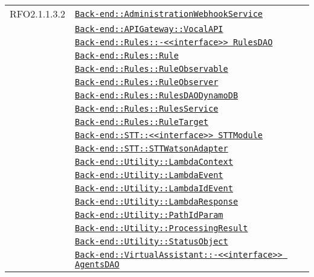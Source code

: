 \begin{longtable}{|>{\centering}m{3cm}|m{10cm}<{\centering}|}
RFO2.1.1.3.2 & \hyperref[Back-end::AdministrationWebhookService]{\texttt{Back-end::AdministrationWebhookService}}\\
& \hyperref[Back-end::APIGateway::VocalAPI]{\texttt{Back-end::APIGateway::VocalAPI}}\\
& \hyperref[Back-end::Rules::<<interface>> RulesDAO]{\texttt{Back-end::Rules::-\linebreak <<interface>> RulesDAO}}\\
& \hyperref[Back-end::Rules::Rule]{\texttt{Back-end::Rules::Rule}}\\
& \hyperref[Back-end::Rules::RuleObservable]{\texttt{Back-end::Rules::RuleObservable}}\\
& \hyperref[Back-end::Rules::RuleObserver]{\texttt{Back-end::Rules::RuleObserver}}\\
& \hyperref[Back-end::Rules::RulesDAODynamoDB]{\texttt{Back-end::Rules::RulesDAODynamoDB}}\\
& \hyperref[Back-end::Rules::RulesService]{\texttt{Back-end::Rules::RulesService}}\\
& \hyperref[Back-end::Rules::RuleTarget]{\texttt{Back-end::Rules::RuleTarget}}\\
& \hyperref[Back-end::STT::<<interface>> STTModule]{\texttt{Back-end::STT::<<interface>> STTModule}}\\
& \hyperref[Back-end::STT::STTWatsonAdapter]{\texttt{Back-end::STT::STTWatsonAdapter}}\\
& \hyperref[Back-end::Utility::LambdaContext]{\texttt{Back-end::Utility::LambdaContext}}\\
& \hyperref[Back-end::Utility::LambdaEvent]{\texttt{Back-end::Utility::LambdaEvent}}\\
& \hyperref[Back-end::Utility::LambdaIdEvent]{\texttt{Back-end::Utility::LambdaIdEvent}}\\
& \hyperref[Back-end::Utility::LambdaResponse]{\texttt{Back-end::Utility::LambdaResponse}}\\
& \hyperref[Back-end::Utility::PathIdParam]{\texttt{Back-end::Utility::PathIdParam}}\\
& \hyperref[Back-end::Utility::ProcessingResult]{\texttt{Back-end::Utility::ProcessingResult}}\\
& \hyperref[Back-end::Utility::StatusObject]{\texttt{Back-end::Utility::StatusObject}}\\
& \hyperref[Back-end::VirtualAssistant::<<interface>> AgentsDAO]{\texttt{Back-end::VirtualAssistant::-\linebreak <<interface>> AgentsDAO}}\\

\end{longtable}
